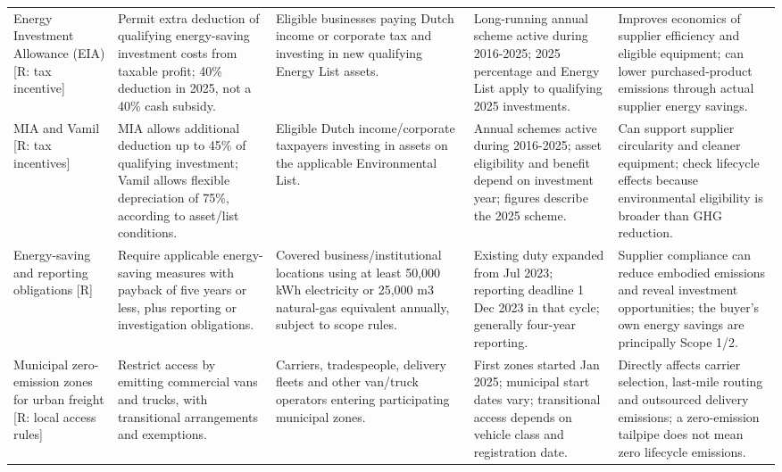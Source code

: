 \documentclass[10pt,a4paper,landscape]{article}
\begin{document}
\begin{tabularx}{\textwidth}{Y{0.85}Y{1.00}Y{0.85}Y{1.05}Y{1.25}}
\addlinespace[5pt]
Energy Investment Allowance (EIA) [R: tax incentive]\cite{nleia} & Permit extra deduction of qualifying energy-saving investment costs from taxable profit; 40\% deduction in 2025, not a 40\% cash subsidy. & Eligible businesses paying Dutch income or corporate tax and investing in new qualifying Energy List assets. & Long-running annual scheme active during 2016-2025; 2025 percentage and Energy List apply to qualifying 2025 investments. & Improves economics of supplier efficiency and eligible equipment; can lower purchased-product emissions through actual supplier energy savings. \\
\addlinespace[5pt]
MIA and Vamil [R: tax incentives]\cite{nlmia} & MIA allows additional deduction up to 45\% of qualifying investment; Vamil allows flexible depreciation of 75\%, according to asset/list conditions. & Eligible Dutch income/corporate taxpayers investing in assets on the applicable Environmental List. & Annual schemes active during 2016-2025; asset eligibility and benefit depend on investment year; figures describe the 2025 scheme. & Can support supplier circularity and cleaner equipment; check lifecycle effects because environmental eligibility is broader than GHG reduction. \\
\addlinespace[5pt]
Energy-saving and reporting obligations [R]\cite{nlenergy,nlenergydate} & Require applicable energy-saving measures with payback of five years or less, plus reporting or investigation obligations. & Covered business/institutional locations using at least 50,000 kWh electricity or 25,000 m3 natural-gas equivalent annually, subject to scope rules. & Existing duty expanded from Jul 2023; reporting deadline 1 Dec 2023 in that cycle; generally four-year reporting. & Supplier compliance can reduce embodied emissions and reveal investment opportunities; the buyer's own energy savings are principally Scope 1/2. \\
\addlinespace[5pt]
Municipal zero-emission zones for urban freight [R: local access rules]\cite{nlze,nlze2025} & Restrict access by emitting commercial vans and trucks, with transitional arrangements and exemptions. & Carriers, tradespeople, delivery fleets and other van/truck operators entering participating municipal zones. & First zones started Jan 2025; municipal start dates vary; transitional access depends on vehicle class and registration date. & Directly affects carrier selection, last-mile routing and outsourced delivery emissions; a zero-emission tailpipe does not mean zero lifecycle emissions. \\

\end{tabularx}
\end{document}
